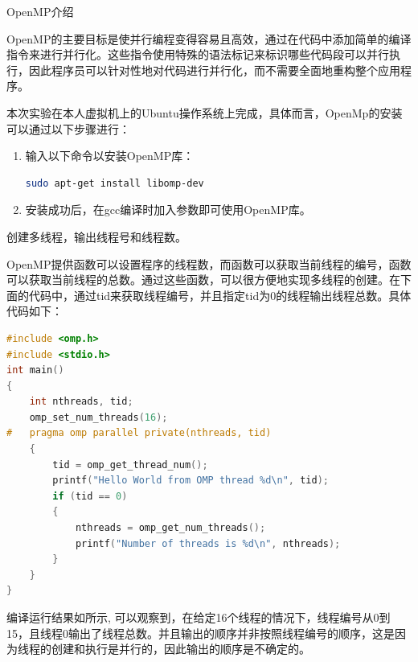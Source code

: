 \documentclass[lang=cn,a4paper,chinesefont=founder,bibend=bibtex]{shu-lab-report}
\begin{document}
\newpage


\begin{tcolorbox}[title=要求1]
  OpenMP介绍
\end{tcolorbox}

OpenMP的主要目标是使并行编程变得容易且高效，通过在代码中添加简单的编译指令来进行并行化。这些指令使用特殊的语法标记来标识哪些代码段可以并行执行，因此程序员可以针对性地对代码进行并行化，而不需要全面地重构整个应用程序。

本次实验在本人虚拟机上的Ubuntu操作系统上完成，具体而言，OpenMp的安装可以通过以下步骤进行：

\begin{enumerate}
  \item 输入以下命令以安装OpenMP库：
        \begin{lstlisting}[language=bash]
  sudo apt-get install libomp-dev
  \end{lstlisting}

  \item 安装成功后，在gcc编译时加入参数即可使用OpenMP库。

\end{enumerate}



\begin{tcolorbox}[title=要求2]
  创建多线程，输出线程号和线程数。
\end{tcolorbox}

OpenMP提供函数可以设置程序的线程数，而函数可以获取当前线程的编号，函数可以获取当前线程的总数。通过这些函数，可以很方便地实现多线程的创建。在下面的代码中，通过tid来获取线程编号，并且指定tid为0的线程输出线程总数。具体代码如下：

\begin{lstlisting}[language=c]
#include <omp.h>
#include <stdio.h>
int main()
{
    int nthreads, tid;
    omp_set_num_threads(16);
#   pragma omp parallel private(nthreads, tid)
    {
        tid = omp_get_thread_num();
        printf("Hello World from OMP thread %d\n", tid);
        if (tid == 0)
        {
            nthreads = omp_get_num_threads();
            printf("Number of threads is %d\n", nthreads);
        }
    }
}
\end{lstlisting}

编译运行结果如所示, 可以观察到，在给定16个线程的情况下，线程编号从0到15，且线程0输出了线程总数。并且输出的顺序并非按照线程编号的顺序，这是因为线程的创建和执行是并行的，因此输出的顺序是不确定的。
\end{document}

